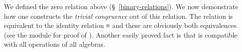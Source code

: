\documentclass[a4paper,UKenglish,cleveref,autoref,thm-restate,11pt]{lipics-v2021}
\begin{document}
We defined the zero relation  above (\S~\ref{binary-relations}). We now demonstrate how one constructs the \textit{trivial congruence} out of this relation. The relation  is equivalent to the identity relation \af ≡ and these are obviously both equivalences (see the \ualibEquality module for proof of ).  Another easily proved fact is that  is compatible with all operations of all algebras.
\ccpad
\begin{code}%
\>[1]\AgdaSpace{}%
\AgdaSymbol{:}\AgdaSpace{}%
\AgdaSpace{}%
\AgdaSpace{}%
\AgdaSpace{}%
\AgdaSpace{}%
\AgdaSymbol{\{}\AgdaSpace{}%
\AgdaSymbol{:}\AgdaSpace{}%
\AgdaSpace{}%
\AgdaSpace{}%
\AgdaSymbol{\}}\AgdaSpace{}%
\AgdaSymbol{(}\AgdaSpace{}%
\AgdaSymbol{:}\AgdaSpace{}%
\AgdaSpace{}%
\AgdaSpace{}%
\AgdaSymbol{)}\AgdaSpace{}%
\AgdaSpace{}%
\AgdaSpace{}%
\AgdaSymbol{\{}\AgdaSpace{}%
\AgdaSymbol{=}\AgdaSpace{}%
\AgdaSymbol{\}}%
\>[87]\AgdaSpace{}%
\<%
\\
%
\>[1]\AgdaSpace{}%
\AgdaSpace{}%
\AgdaSymbol{\{}\AgdaSymbol{\}}\AgdaSpace{}%
\AgdaSpace{}%
%
\>[33]\AgdaSymbol{=}\AgdaSpace{}%
\AgdaSpace{}%
\AgdaSymbol{(}\AgdaSpace{}%
\AgdaSpace{}%
\AgdaSymbol{)}\AgdaSpace{}%
\AgdaSymbol{(}\AgdaSpace{}%
\AgdaSpace{}%
\AgdaSpace{}%
\AgdaSpace{}%
\AgdaSpace{}%
\AgdaSymbol{))}\<%
\\
%
\\[\AgdaEmptyExtraSkip]%
%
\>[1]\AgdaSpace{}%
\AgdaSymbol{:}\AgdaSpace{}%
\AgdaSpace{}%
\AgdaSpace{}%
\AgdaSpace{}%
\AgdaSpace{}%
\AgdaSymbol{\{}\AgdaSpace{}%
\AgdaSymbol{:}\AgdaSpace{}%
\AgdaSpace{}%
\AgdaSpace{}%
\AgdaSymbol{\}}\AgdaSpace{}%
\AgdaSpace{}%
\AgdaSpace{}%
\AgdaSpace{}%
\<%
\\
%
\>[1]\AgdaSpace{}%
\AgdaSpace{}%
\AgdaSymbol{\{}\AgdaSymbol{\}}\AgdaSpace{}%
\AgdaSymbol{=}\AgdaSpace{}%
\AgdaSpace{}%
\AgdaSpace{}%
\AgdaSpace{}%
\AgdaSpace{}%
\AgdaSpace{}%
\AgdaSpace{}%
\AgdaSymbol{\{}\AgdaSymbol{\}}\AgdaSpace{}%
\AgdaSpace{}%
\<%
\end{code}
\end{document}
